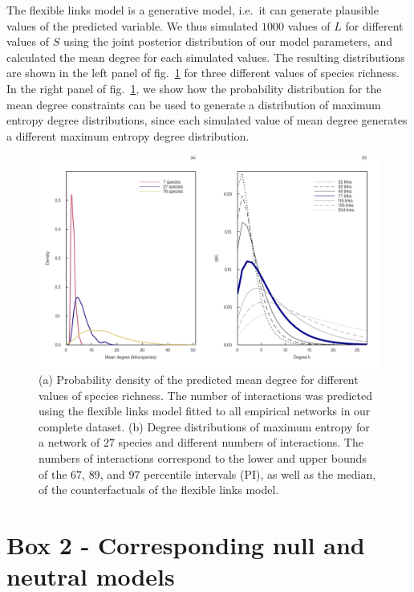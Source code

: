 \documentclass[11pt]{article}
\makeatletter
\def\maxwidth{\ifdim\Gin@nat@width>\linewidth\linewidth
\else\Gin@nat@width\fi}
\let\Oldincludegraphics\includegraphics
\renewcommand{\includegraphics}[1]{\Oldincludegraphics[width=\maxwidth]{#1}}
\makeatother
\begin{document}
The flexible links model is a generative model, i.e.~it can generate
plausible values of the predicted variable. We thus simulated \(1000\)
values of \(L\) for different values of \(S\) using the joint posterior
distribution of our model parameters, and calculated the mean degree for
each simulated values. The resulting distributions are shown in the left
panel of fig.~\ref{fig:degree_dist_fl} for three different values of
species richness. In the right panel of fig.~\ref{fig:degree_dist_fl},
we show how the probability distribution for the mean degree constraints
can be used to generate a distribution of maximum entropy degree
distributions, since each simulated value of mean degree generates a
different maximum entropy degree distribution.

\begin{figure}
\hypertarget{fig:degree_dist_fl}{%
\centering
\includegraphics{figures/maxent_degree_dist_fl.png}
\caption{(a) Probability density of the predicted mean degree for
different values of species richness. The number of interactions was
predicted using the flexible links model fitted to all empirical
networks in our complete dataset. (b) Degree distributions of maximum
entropy for a network of \(27\) species and different numbers of
interactions. The numbers of interactions correspond to the lower and
upper bounds of the \(67%
\), \(89%
\), and \(97%
\) percentile intervals (PI), as well as the median, of the
counterfactuals of the flexible links model.}\label{fig:degree_dist_fl}
}
\end{figure}

\hypertarget{box-2---corresponding-null-and-neutral-models}{%
\section{Box 2 - Corresponding null and neutral
models}\label{box-2---corresponding-null-and-neutral-models}}
\end{document}
